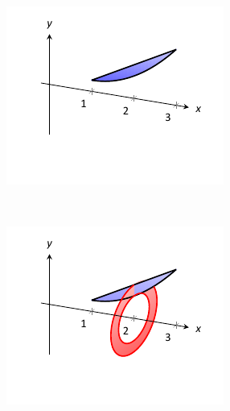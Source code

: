 \begin{solution}
{\begin{figure}[H]
	\centering
	\begin{subfigure}[t]{0.33\textwidth}
		\includegraphics[width=\textwidth]{figures/figwash1}
		\label{fig:figwash1a}
		\caption{} 
	\end{subfigure}%
	~ 
	\begin{subfigure}[t]{0.33\textwidth}    
		\includegraphics[width=\textwidth]{figures/figwash1c}
		\label{fig:figwash1b}
		\caption{}    
	\end{subfigure}%
		~ 
		\begin{subfigure}[t]{0.33\textwidth}    

\end{subfigure}
\end{figure}}
\end{solution}
